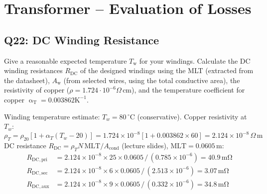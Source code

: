 \documentclass{PELsmallreport}
\begin{document}
 \hfill{}













\newpage
\section{Transformer -- Evaluation of Losses}


\subsection{Q22: DC Winding Resistance} 
Give a reasonable expected temperature $T_\mathrm{w}$ for your windings.
Calculate the DC winding resistances $R_\mathrm{DC}$ of the designed windings using the MLT (extracted from the datasheet), $A_\mathrm{w}$ (from selected wires, using the total conductive area), the resistivity of copper ($\rho = 1.724 \cdot 10^{-6} \Omega \, \mathrm{cm}$), and the temperature coefficient for copper $\upalpha_\mathrm{T} = 0.003862 \mathrm{K}^{-1}$. 

\begin{framed}
	\vspace{2em}
	Winding temperature estimate: $T_w = 80\,^\circ\mathrm{C}$ (conservative). Copper resistivity at $T_w$:
\begin{equation}
    \rho_T = \rho_{20}[1+\alpha_T(T_w-20)] = 1.724\!\times\!10^{-8}[1+0.003862\times60] = 2.124\!\times\!10^{-8}\,\Omega\,\mathrm{m}
\end{equation}
DC resistance $R_\mathrm{DC} = \rho_T N\,\mathrm{MLT}/A_\mathrm{cond}$ (lecture slides), $\mathrm{MLT}=0.0605\,\mathrm{m}$:
\begin{align}
    R_\mathrm{DC,pri} &= 2.124\!\times\!10^{-8}\times25\times0.0605\,/\,(0.785\!\times\!10^{-6}) = 40.9\,\mathrm{m\Omega}\\
    R_\mathrm{DC,sec} &= 2.124\!\times\!10^{-8}\times6\times0.0605\,/\,(2.513\!\times\!10^{-6}) = 3.07\,\mathrm{m\Omega}\\
    R_\mathrm{DC,aux} &= 2.124\!\times\!10^{-8}\times9\times0.0605\,/\,(0.332\!\times\!10^{-6}) = 34.8\,\mathrm{m\Omega}
\end{align}
	\vspace{2em}
\end{framed}

 \quad 
{} \quad 
{} \quad 
{} \hfill{}
\end{document}
